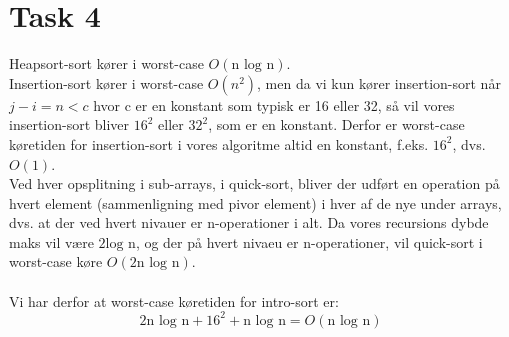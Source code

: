 \section{Task 4}

Heapsort-sort kører i worst-case $O(\text{n log n})$.\\
Insertion-sort kører i worst-case $O(n^2)$, men da vi kun kører insertion-sort når $j-i = n < c$ hvor c er en konstant som typisk er 16 eller 32, så vil vores insertion-sort bliver $16^2$ eller $32^2$, som er en konstant. Derfor er worst-case køretiden for insertion-sort i vores algoritme altid en konstant, f.eks. $16^2$, dvs. $O(1)$.\\
Ved hver opsplitning i sub-arrays, i quick-sort, bliver der udført en operation på hvert element (sammenligning med pivor element) i hver af de nye under arrays, dvs. at der ved hvert nivauer er n-operationer i alt. Da vores recursions dybde maks vil være $2 \text{log n}$, og der på hvert nivaeu er n-operationer, vil quick-sort i worst-case køre $O(2\text{n log n})$.\\\\
Vi har derfor at worst-case køretiden for intro-sort er:
$$
2\text{n log n} + 16^2 + \text{n log n} = O(\text{n log n})
$$ 
